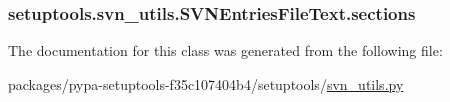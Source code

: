 \subsubsection[{sections}]{\setlength{\rightskip}{0pt plus 5cm}setuptools.\+svn\+\_\+utils.\+S\+V\+N\+Entries\+File\+Text.\+sections}\label{classsetuptools_1_1svn__utils_1_1SVNEntriesFileText_a149ca4294edfb5a24a10451113c65268}


The documentation for this class was generated from the following file\+:\begin{DoxyCompactItemize}
\item 
packages/pypa-\/setuptools-\/f35c107404b4/setuptools/\hyperlink{svn__utils_8py}{svn\+\_\+utils.\+py}\end{DoxyCompactItemize}
